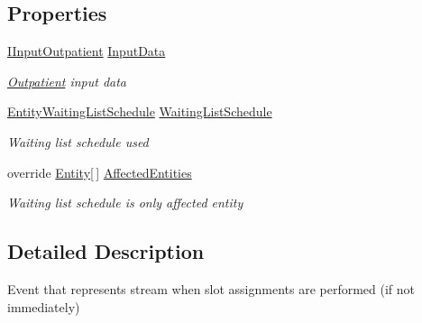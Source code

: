 \subsection*{Properties}
\begin{DoxyCompactItemize}
\item 
\hyperlink{interface_general_health_care_elements_1_1_department_models_1_1_outpatient_1_1_i_input_outpatient}{I\+Input\+Outpatient} \hyperlink{class_general_health_care_elements_1_1_department_models_1_1_outpatient_1_1_waiting_list_1_1_event_outpatient_start_dispatching_ad40a6501b513b4463eee8d8752cac74b}{Input\+Data}
\begin{DoxyCompactList}\small\item\em \hyperlink{namespace_general_health_care_elements_1_1_department_models_1_1_outpatient}{Outpatient} input data \end{DoxyCompactList}\item 
\hyperlink{class_general_health_care_elements_1_1_booking_models_1_1_entity_waiting_list_schedule}{Entity\+Waiting\+List\+Schedule} \hyperlink{class_general_health_care_elements_1_1_department_models_1_1_outpatient_1_1_waiting_list_1_1_event_outpatient_start_dispatching_a0f3082e2e60c9fb4c3a37db2ae7830f8}{Waiting\+List\+Schedule}
\begin{DoxyCompactList}\small\item\em Waiting list schedule used \end{DoxyCompactList}\item 
override \hyperlink{class_simulation_core_1_1_h_c_c_m_elements_1_1_entity}{Entity}\mbox{[}$\,$\mbox{]} \hyperlink{class_general_health_care_elements_1_1_department_models_1_1_outpatient_1_1_waiting_list_1_1_event_outpatient_start_dispatching_afe535ecae3b63fda6b4ae1b36821fea4}{Affected\+Entities}
\begin{DoxyCompactList}\small\item\em Waiting list schedule is only affected entity \end{DoxyCompactList}\end{DoxyCompactItemize}


\subsection{Detailed Description}
Event that represents stream when slot assignments are performed (if not immediately) 



